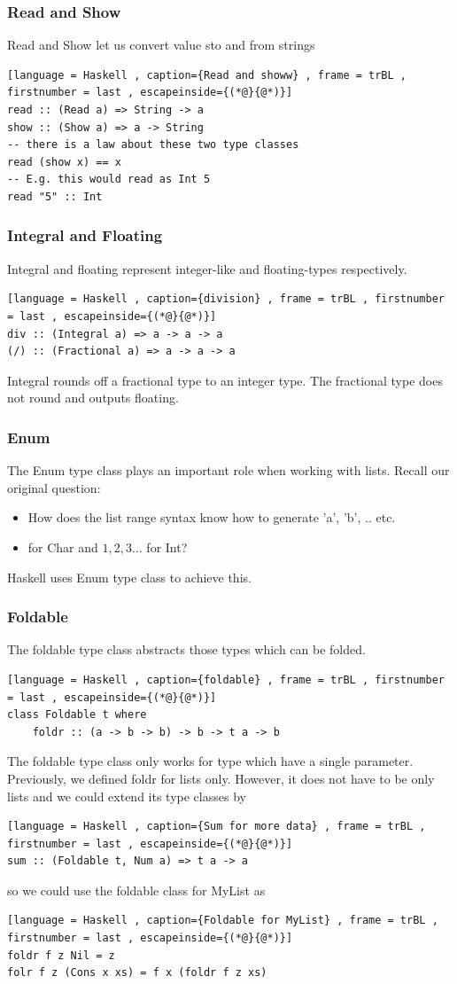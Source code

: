 \documentclass[a4paper]{article}
\theoremstyle{plain}
\theoremstyle{definition}
\theoremstyle{remark}
\begin{document}
\subsubsection{Read and Show}
Read and Show let us convert value sto and from strings
\begin{lstlisting}[language = Haskell , caption={Read and showw} , frame = trBL , firstnumber = last , escapeinside={(*@}{@*)}]
read :: (Read a) => String -> a
show :: (Show a) => a -> String
-- there is a law about these two type classes
read (show x) == x
-- E.g. this would read as Int 5
read "5" :: Int
\end{lstlisting}
\subsubsection{Integral and Floating}
Integral and floating represent integer-like and floating-types respectively.
\begin{lstlisting}[language = Haskell , caption={division} , frame = trBL , firstnumber = last , escapeinside={(*@}{@*)}]
div :: (Integral a) => a -> a -> a
(/) :: (Fractional a) => a -> a -> a
\end{lstlisting}
Integral rounds off a fractional type to an integer type. The fractional type does not round and outputs floating.
\subsubsection{Enum}
The Enum type class plays an important role when working with lists. Recall our original question:
\begin{itemize}
	\item How does the list range syntax know how to generate 'a', 'b', .. etc.
	\item for Char and $1,2,3\ldots$ for Int?
\end{itemize}
Haskell uses Enum type class to achieve this.
\subsubsection{Foldable}
The foldable type class abstracts those types which can be folded.
\begin{lstlisting}[language = Haskell , caption={foldable} , frame = trBL , firstnumber = last , escapeinside={(*@}{@*)}]
class Foldable t where
	foldr :: (a -> b -> b) -> b -> t a -> b
\end{lstlisting}
The foldable type class only works for type which have a single parameter. Previously, we defined foldr for lists only. However, it does not have to be only lists and we could extend its type classes by
\begin{lstlisting}[language = Haskell , caption={Sum for more data} , frame = trBL , firstnumber = last , escapeinside={(*@}{@*)}]
sum :: (Foldable t, Num a) => t a -> a
\end{lstlisting}
so we could use the foldable class for MyList as
\begin{lstlisting}[language = Haskell , caption={Foldable for MyList} , frame = trBL , firstnumber = last , escapeinside={(*@}{@*)}]
foldr f z Nil = z
folr f z (Cons x xs) = f x (foldr f z xs)
\end{lstlisting}
\end{document}
